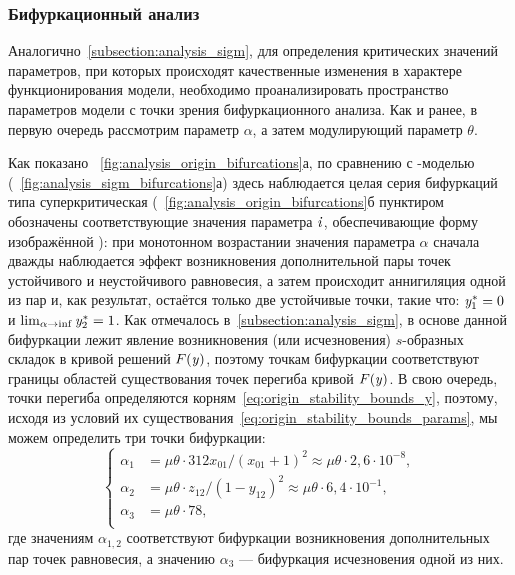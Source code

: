 
\subsubsection{Бифуркационный анализ}

Аналогично~\autoref{subsection:analysis_sigm}, для определения критических значений параметров, при которых происходят качественные изменения в характере функционирования модели, необходимо проанализировать пространство параметров модели с точки зрения бифуркационного анализа. Как и ранее, в первую очередь рассмотрим параметр $\alpha$, а затем модулирующий параметр $\theta$.

Как показано \onfigure~\ref{fig:analysis_origin_bifurcations}а, по сравнению с -моделью (\seefigure~\ref{fig:analysis_sigm_bifurcations}а) здесь наблюдается целая серия бифуркаций типа суперкритическая  (\onfigure~\ref{fig:analysis_origin_bifurcations}б пунктиром обозначены соответствующие значения параметра $\mathit{i}$, обеспечивающие форму изображённой ): при монотонном возрастании значения параметра $\alpha$ сначала дважды наблюдается эффект возникновения дополнительной пары точек устойчивого и неустойчивого равновесия, а затем происходит аннигиляция одной из пар и, как результат, остаётся только две устойчивые точки, такие что: $\mathit{y}^{*}_{1} = 0$ и $\lim_{\alpha \to \inf} \mathit{y}^{*}_{2} = 1$. Как отмечалось в~\autoref{subsection:analysis_sigm}, в основе данной бифуркации лежит явление возникновения (или исчезновения) $s$-образных складок в кривой решений $F(\mathit{y})$, поэтому точкам бифуркации соответствуют границы областей существования точек перегиба кривой $F(\mathit{y})$. В свою очередь, точки перегиба определяются корням~\eqref{eq:origin_stability_bounds_y}, поэтому, исходя из условий их существования~\eqref{eq:origin_stability_bounds_params}, мы можем определить три точки бифуркации:
\begin{equation}
    \nonumber
    \begin{cases}
        \alpha_{1} &= \mu \theta \cdot 312 x_{01} / (x_{01} + 1)^2 \approx \mu \theta \cdot 2,6 \cdot 10^{-8}, \\
        \alpha_{2} &= \mu \theta \cdot z_{12} / (1 - y_{12})^2 \approx \mu \theta \cdot 6,4 \cdot 10^{-1}, \\
        \alpha_{3} &= \mu \theta \cdot 78,\\
    \end{cases}
\end{equation}
где значениям $\alpha_{1,2}$ соответствуют бифуркации возникновения дополнительных пар точек равновесия, а значению $\alpha_{3}$ --- бифуркация исчезновения одной из них.

